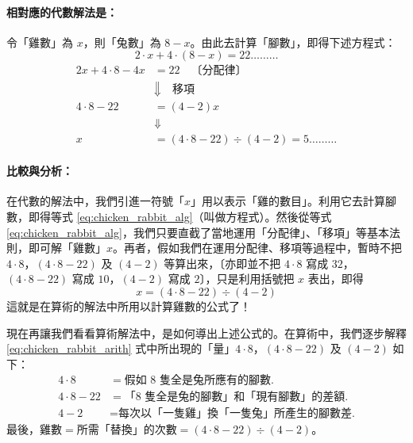 \paragraph{相對應的代數解法是：}
令「雞數」為 $x$，則「兔數」為 $8-x$。由此去計算「腳數」，即得下述方程式：
\begin{equation}\label{eq:chicken_rabbit_alg}
  2 \cdot x + 4 \cdot (8-x) = 22 \dots\dots\dots
\end{equation}
\begin{align*}
  2x + 4 \cdot 8 - 4x &= 22 \quad \text{〔分配律〕} \\
  &\Downarrow \quad \text{移項} \\
  4 \cdot 8 - 22 &= (4 - 2)x \\
  &\Downarrow \\
  x &= (4 \cdot 8 - 22) \div (4 - 2) = 5 \dots\dots\dots
\end{align*}

\paragraph{比較與分析：}
在代數的解法中，我們引進一符號「$x$」用以表示「雞的數目」。利用它去計算腳數，即得等式 \eqref{eq:chicken_rabbit_alg}（叫做方程式）。然後從等式 \eqref{eq:chicken_rabbit_alg}，我們只要直截了當地運用「分配律」、「移項」等基本法則，即可解「雞數」$x$。再者，假如我們在運用分配律、移項等過程中，暫時不把 $4 \cdot 8$，$(4 \cdot 8 - 22)$ 及 $(4 - 2)$ 等算出來，〔亦即並不把 $4 \cdot 8$ 寫成 $32$，$(4 \cdot 8 - 22)$ 寫成 $10$，$(4 - 2)$ 寫成 $2$〕，只是利用括號把 $x$ 表出，即得
\begin{equation*}
  x = (4 \cdot 8 - 22) \div (4 - 2)
\end{equation*}
這就是在算術的解法中所用以計算雞數的公式了！

現在再讓我們看看算術解法中，是如何導出上述公式的。在算術中，我們逐步解釋 \eqref{eq:chicken_rabbit_arith} 式中所出現的「量」$4 \cdot 8$，$(4 \cdot 8 - 22)$ 及 $(4 - 2)$ 如下：
\begin{align*}
  4 \cdot 8 &= \text{假如 $8$ 隻全是兔所應有的腳數.} \\
  4 \cdot 8 - 22 &= \text{「$8$ 隻全是兔的腳數」和「現有腳數」的差額.} \\
  4 - 2 &= \text{每次以「一隻雞」換「一隻兔」所產生的腳數差.}
\end{align*}
最後，$\text{雞數} = \text{所需「替換」的次數} = (4 \cdot 8 - 22) \div (4 - 2)$。

